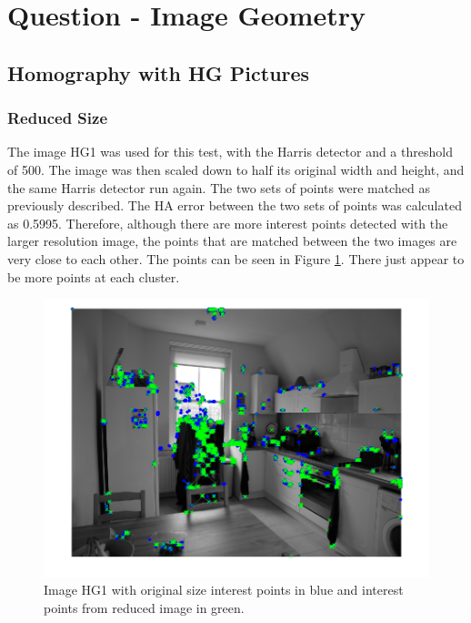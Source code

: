 \documentclass[a4paper, 10pt, conference]{ieeeconf}
\begin{document}
\section{Question - Image Geometry}

\subsection{Homography with HG Pictures}

\subsubsection{Reduced Size}
The image HG1 was used for this test, with the Harris detector and a threshold of 500. The image was then scaled down to half its original width and height, and the same Harris detector run again. The two sets of points were matched as previously described. The HA error between the two sets of points was calculated as 0.5995. Therefore, although there are more interest points detected with the larger resolution image, the points that are matched between the two images are very close to each other. The points can be seen in Figure \ref{fig:reducedcompare}. There just appear to be more points at each cluster.

\begin{figure}[!ht]
  \centering
  \includegraphics[width=0.75\linewidth]{pic/q2_1_a_imgBoth}
  \caption{Image HG1 with original size interest points in blue and interest points from reduced image in green.}\vspace{-.5cm}
  \label{fig:reducedcompare}
\end{figure}
\end{document}
